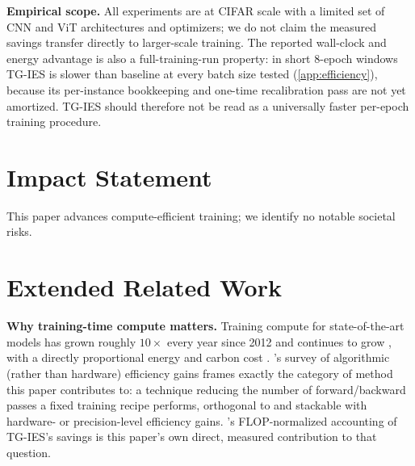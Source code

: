 \documentclass{article}
\theoremstyle{plain}
\theoremstyle{definition}
\theoremstyle{remark}
\begin{document}
\textbf{Empirical scope.} All experiments are at CIFAR scale with a limited set of CNN and ViT architectures and optimizers; we do not claim the measured savings transfer directly to larger-scale training. The reported wall-clock and energy advantage is also a full-training-run property: in short 8-epoch windows TG-IES is slower than baseline at every batch size tested (\cref{app:efficiency}), because its per-instance bookkeeping and one-time recalibration pass are not yet amortized. TG-IES should therefore not be read as a universally faster per-epoch training procedure.

\section*{Impact Statement}
This paper advances compute-efficient training; we identify no notable societal risks.




\newpage
\appendix
\onecolumn

\section{Extended Related Work}
\label{app:related}

\textbf{Why training-time compute matters.} Training compute for state-of-the-art models has grown roughly $10\times$ every year since 2012 and continues to grow \citep{sevilla2022compute}, with a directly proportional energy and carbon cost \citep{patterson2022carbon}. \citet{bartoldson2023computeefficient}'s survey of algorithmic (rather than hardware) efficiency gains frames exactly the category of method this paper contributes to: a technique reducing the number of forward/backward passes a fixed training recipe performs, orthogonal to and stackable with hardware- or precision-level efficiency gains. 's FLOP-normalized accounting of TG-IES's savings is this paper's own direct, measured contribution to that question.
\end{document}

